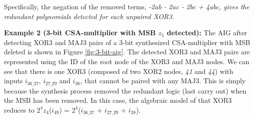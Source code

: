 {\color{red}Specifically, the negation of the removed terms, \textit{-2ab - 2ac - 2bc + 4abc, gives the redundant polynomials detected for each unpaired XOR3}. 



\textbf{Example 2 (3-bit CSA-multiplier with MSB $z_{5}$ detected):} The AIG after detecting XOR3 and MAJ3 pairs of a 3-bit synthesized CSA-multiplier with MSB deleted is shown in Figure \ref{fig:3-bit-aig}. The detected XOR3 and MAJ3 pairs are represented using the ID of the root node of the XOR3 and MAJ3 nodes. We can see that there is one XOR3 (composed of two XOR2 nodes, \textit{41} and \textit{44}) with inputs $i_{36\_37}$, $i_{27\_29}$ and $i_{38}$, that cannot be paired with any MAJ3. This is simply because the synthesis process removed the redundant logic (last carry out) when the MSB has been removed. In this case, the algebraic model of that XOR3 reduces to $2^{4}z_{4}$($i_{49}$) = $2^4$($i_{36\_37}$ + $i_{27\_29}$ + $i_{38}$).



}

